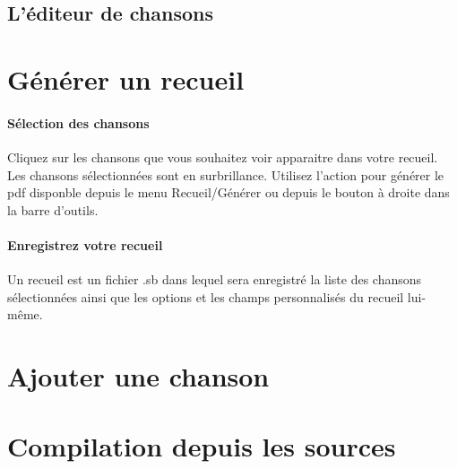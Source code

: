 \subsection{L'éditeur de chansons}


\section{Générer un recueil}

\paragraph{Sélection des chansons}
Cliquez sur les chansons que vous souhaitez voir apparaitre dans votre
recueil.  Les chansons sélectionnées sont en surbrillance. Utilisez
l'action  pour générer le pdf disponble depuis le
menu Recueil/Générer ou depuis le bouton à droite dans la barre
d'outils.

\paragraph{Enregistrez votre recueil}
Un recueil est un fichier .sb dans lequel sera enregistré la liste des
chansons sélectionnées ainsi que les options et les champs
personnalisés du recueil lui-même.



\section{Ajouter une chanson}

\todo

\section{Compilation depuis les sources}

